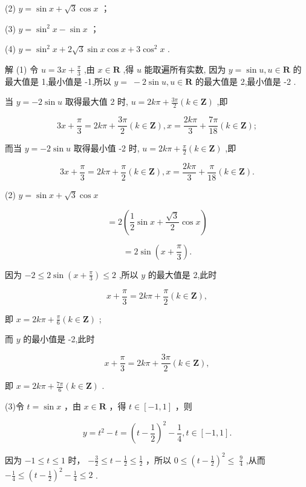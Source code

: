 \documentclass[10pt]{article}
\begin{document}
(2) \(y = \sin x + \sqrt{3}\cos x\) ；

(3) \(y = {\sin }^{2}x - \sin x\) ；

(4) \(y = {\sin }^{2}x + 2\sqrt{3}\sin x\cos x + 3{\cos }^{2}x\) .

解 (1) 令 \(u = {3x} + \frac{\pi }{3}\) ,由 \(x \in  \mathbf{R}\) ,得 \(u\) 能取遍所有实数, 因为 \(y = \sin u,u \in  \mathbf{R}\) 的最大值是 1,最小值是 -1,所以 \(y = \; - 2\sin u,u \in  \mathbf{R}\) 的最大值是 2,最小值是 -2 .

当 \(y =  - 2\sin u\) 取得最大值 2 时, \(u = {2k\pi } + \frac{3\pi }{2}\left( {k \in  \mathbf{Z}}\right)\) ,即

\[
{3x} + \frac{\pi }{3} = {2k\pi } + \frac{3\pi }{2}\left( {k \in  \mathbf{Z}}\right) ,x = \frac{2k\pi }{3} + \frac{7\pi }{18}\left( {k \in  \mathbf{Z}}\right) ;
\]

而当 \(y =  - 2\sin u\) 取得最小值 -2 时, \(u = {2k\pi } + \frac{\pi }{2}\left( {k \in  \mathbf{Z}}\right)\) ,即

\[
{3x} + \frac{\pi }{3} = {2k\pi } + \frac{\pi }{2}\left( {k \in  \mathbf{Z}}\right) ,x = \frac{2k\pi }{3} + \frac{\pi }{18}\left( {k \in  \mathbf{Z}}\right) .
\]

(2) \(y = \sin x + \sqrt{3}\cos x\)

\[
= 2\left( {\frac{1}{2}\sin x + \frac{\sqrt{3}}{2}\cos x}\right)
\]

\[
= 2\sin \left( {x + \frac{\pi }{3}}\right) .
\]

因为 \(- 2 \leq  2\sin \left( {x + \frac{\pi }{3}}\right)  \leq  2\) ,所以 \(y\) 的最大值是 2,此时

\[
x + \frac{\pi }{3} = {2k\pi } + \frac{\pi }{2}\left( {k \in  \mathbf{Z}}\right) ,
\]

即 \(x = {2k\pi } + \frac{\pi }{6}\left( {k \in  \mathbf{Z}}\right)\) ;

而 \(y\) 的最小值是 -2,此时

\[
x + \frac{\pi }{3} = {2k\pi } + \frac{3\pi }{2}\left( {k \in  \mathbf{Z}}\right) ,
\]

即 \(x = {2k\pi } + \frac{7\pi }{6}\left( {k \in  \mathbf{Z}}\right)\) .

(3)令 \(t = \sin x\) ，由 \(x \in  \mathbf{R}\) ，得 \(t \in  \left\lbrack  {-1,1}\right\rbrack\) ，则

\[
y = {t}^{2} - t = {\left( t - \frac{1}{2}\right) }^{2} - \frac{1}{4},t \in  \left\lbrack  {-1,1}\right\rbrack  .
\]

因为 \(- 1 \leq  t \leq  1\) 时， \(- \frac{3}{2} \leq  t - \frac{1}{2} \leq  \frac{1}{2}\) ，所以 \(0 \leq  {\left( t - \frac{1}{2}\right) }^{2} \leq \; \frac{9}{4}\) ,从而 \(- \frac{1}{4} \leq  {\left( t - \frac{1}{2}\right) }^{2} - \frac{1}{4} \leq  2\) .
\end{document}
